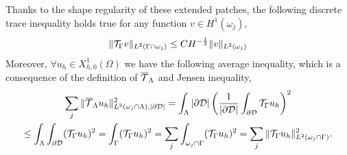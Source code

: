 \documentclass[r]{siamart171218}
\begin{document}
Thanks to the shape regularity of these extended patches, the following discrete trace inequality holds true for any function $v\in H^1(\omega_j)$, 
\begin{equation}\label{discr_trace_ineq}
\|\trace v\|_{L^2(\Gamma\cap \omega_j)} \leq C H^{-\frac 12} \|v\|_{L^2(\omega_j)}
\end{equation}
Moreover, $\forall u_h \in X^1_{h,0}(\Omega)$ we have the following average inequality, 
which is a consequence of the definition of ${\overline{\mathcal{T}}_\Lambda}$ and Jensen inequality,
\begin{multline}\label{eq:avrg_ineq}
\sum _j \|\mtrace u_h\|^2_{L^2(\patch \cap \Lambda),|\DD| }
= \int_{\Lambda} |\DD| \left( \frac{1}{|\DD|} \int_{\DD} \trace u_h \right)^2
\\
\leq \int_{\Lambda} \int_{\DD} (\trace u_h)^2
= \int_{\Gamma} (\trace u_h)^2
= \sum _j \int_{\patch \cap \Gamma} (\trace u_h)^2
= \sum _j \|\trace u_h\|^2_{L^2(\patch \cap \Gamma)}.
\end{multline}


%
\end{document}
